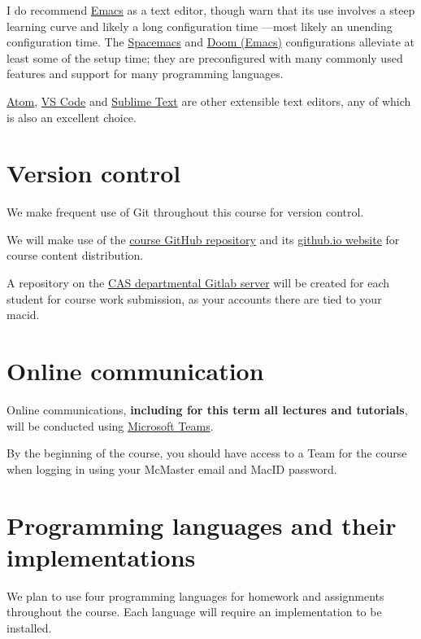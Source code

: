 \documentclass[11pt]{article}
\begin{document}
I do recommend \href{https://www.gnu.org/software/emacs/}{Emacs} as a text editor,
though warn that its use involves a steep learning curve
and likely a long configuration time
—most likely an unending configuration time.
The \href{https://www.spacemacs.org/}{Spacemacs} and \href{https://github.com/hlissner/doom-emacs}{Doom (Emacs)} configurations alleviate at least some
of the setup time; they are preconfigured with many commonly used features
and support for many programming languages.

\href{https://atom.io/}{Atom}, \href{https://code.visualstudio.com/}{VS Code} and
\href{https://www.sublimetext.com/}{Sublime Text} are
other extensible text editors, any of which is also
an excellent choice.

\section{Version control}
\label{sec:org8e87e54}
We make frequent use of Git throughout this course for
version control.

We will make use of the
\href{https://github.com/armkeh/principles-of-programming-languages}{course GitHub repository}
and its
\href{https://armkeh.github.io/principles-of-programming-languages/}{github.io website}
for course content distribution.

A repository on the
\href{https://gitlab.cas.mcmaster.ca/}{CAS departmental Gitlab server}
will be created for each student for course work submission,
as your accounts there are tied to your macid.

\section{Online communication}
\label{sec:orgea61503}
Online communications,
\textbf{including for this term all lectures and tutorials},
will be conducted using
\href{https://teams.microsoft.com}{Microsoft Teams}.

By the beginning of the course, you should have access to
a Team for the course when logging in using your McMaster email
and MacID password.

\section{Programming languages and their implementations}
\label{sec:org05350ec}
We plan to use four programming languages
for homework and assignments throughout the course.
Each language will require an implementation to be installed.
\end{document}
